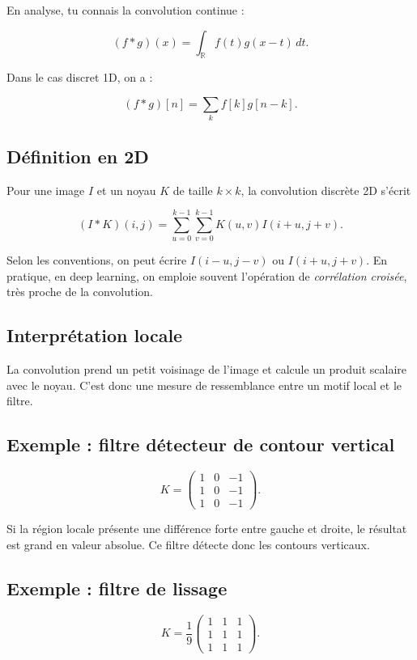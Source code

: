 \documentclass[11pt,a4paper]{article}
\begin{document}
En analyse, tu connais la convolution continue :

\[
(f \ast g)(x) = \int_{\mathbb{R}} f(t)g(x-t)\,dt.
\]

Dans le cas discret 1D, on a :

\[
(f \ast g)[n] = \sum_k f[k]g[n-k].
\]

\subsection{Définition en 2D}

Pour une image $I$ et un noyau $K$ de taille $k \times k$, la convolution discrète 2D s'écrit

\[
(I \ast K)(i,j) = \sum_{u=0}^{k-1} \sum_{v=0}^{k-1} K(u,v)I(i+u,j+v).
\]

Selon les conventions, on peut écrire $I(i-u,j-v)$ ou $I(i+u,j+v)$. En pratique, en deep learning, on emploie souvent l'opération de \emph{corrélation croisée}, très proche de la convolution.

\subsection{Interprétation locale}

La convolution prend un petit voisinage de l'image et calcule un produit scalaire avec le noyau. C'est donc une mesure de ressemblance entre un motif local et le filtre.

\subsection{Exemple : filtre détecteur de contour vertical}

\[
K =
\begin{pmatrix}
1 & 0 & -1 \\
1 & 0 & -1 \\
1 & 0 & -1
\end{pmatrix}.
\]

Si la région locale présente une différence forte entre gauche et droite, le résultat est grand en valeur absolue. Ce filtre détecte donc les contours verticaux.

\subsection{Exemple : filtre de lissage}

\[
K = \frac{1}{9}
\begin{pmatrix}
1 & 1 & 1 \\
1 & 1 & 1 \\
1 & 1 & 1
\end{pmatrix}.
\]
\end{document}
